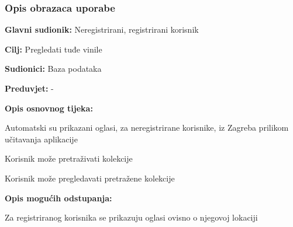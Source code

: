 				\subsubsection{Opis obrazaca uporabe}
					

				\noindent {}
					\begin{packed_item}
	
						\item \textbf{Glavni sudionik: }Neregistrirani, registrirani korisnik
						\item  \textbf{Cilj:} Pregledati tuđe vinile
						\item  \textbf{Sudionici:} Baza podataka
						\item  \textbf{Preduvjet:} -
						\item  \textbf{Opis osnovnog tijeka:}
						
						\item[] \begin{packed_enum}
	
							\item Automatski su prikazani oglasi, za neregistrirane korisnike, iz Zagreba prilikom učitavanja aplikacije
							\item Korisnik može pretraživati kolekcije
							\item Korisnik može pregledavati pretražene kolekcije

						\end{packed_enum}
						
						\item  \textbf{Opis mogućih odstupanja:}
						
						\item[] \begin{packed_item}
	
							\item[1.a] Za registriranog korisnika se prikazuju oglasi ovisno o njegovoj lokaciji
							
						\end{packed_item}						
					\end{packed_item}
					
